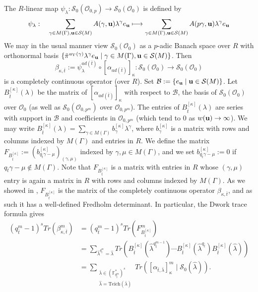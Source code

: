 \documentclass{article}
\theoremstyle{remark}
\def\bb #1{ {\mathbb #1} }
\def\c #1{ {\mathcal #1} }
\def\b #1{ {\bf #1} }
\begin{document}
The $R$-linear map $\psi_\lambda: \c S_0(\c O_{0, p}) \rightarrow \c S_0(\c O_0)$ is defined by 
\[
\psi_\lambda: \quad \sum_{\gamma \in M(\Gamma), \b u \in \c S(M)} A(\gamma, \b u)  \lambda^\gamma e_{\b u} \longmapsto \sum_{\gamma \in M(\Gamma), \b u \in \c S(M)} A(p \gamma, \b u)  \lambda^\gamma e_{\b u}
\]
We may in the usual manner view $\c S_0(\c O_0)$ as a $p$-adic Banach space over $R$ with orthonormal basis $\{ \tilde \pi^{w_\Gamma(\gamma)} \lambda^\gamma e_{\b u} \mid \gamma \in M(\Gamma), \b u \in \c S(M) \}$. Then 
\[
\beta_{\kappa, \bar t} := \psi_\lambda^{a d(\bar t)} \circ [\alpha_{a d(\bar t)}]_\kappa: \c S_0(\c O_0) \rightarrow \c S_0(\c O_0)
\]
is a completely continuous operator (over $R$).  Set $\c B := \{ e_{\b u} \mid  \b u \in \c S(M)\}$. Let $B^{[\kappa]}_{\bar t}(\lambda)$ be the matrix of $[\alpha_{a d(\bar t)}]_\kappa$ with respect to $\c B$, the basis of $\c S_0(\c O_0)$ over $\c O_0$ (as well as $\c S_0(\c O_{0, p^m})$ over $\c O_{0, p^m}$). The entries of $B_{\bar t}^{[\kappa]}(\lambda)$ are series with support in $\c B$ and coefficients in $\c O_{0, p^m}$ (which tend to 0 as $w(\b u) \rightarrow \infty$). We may write $B^{[\kappa]}_{\bar t}(\lambda) = \sum_{\gamma \in M(\Gamma)} b_\gamma^{[\kappa]} \lambda^\gamma$, where $b_\gamma^{[\kappa]}$ is a matrix with rows and columns indexed by $M(\Gamma)$ and entries in $R$. We define the matrix $F_{B^{[\kappa]}_{\bar t}} := (b_{q_{\bar t} \gamma - \mu}^{[\kappa]} )_{(\gamma, \mu)}$ indexed by $\gamma, \mu \in M(\Gamma)$, and we set $b_{q_{\bar t} \gamma - \mu}^{[\kappa]} := 0$ if $q_{\bar t} \gamma - \mu \not\in M(\Gamma)$. Note that $F_{B^{[\kappa]}_{\bar t}}$ is a matrix with entries in $R$ whose $(\gamma, \mu)$ entry is again a matrix in $R$ with rows and columns indexed by $M(\Gamma)$. As we showed in \cite[\S 2.3]{MR3239170}, $F_{B^{[\kappa]}_{\bar t}}$ is the matrix of the completely continuous operator $\beta_{\kappa, \bar t}$, and as such it has a well-defined Fredholm determinant. In particular, the Dwork trace formula gives
\begin{align*}
(q_{\bar t}^m - 1)^s Tr( \beta_{\kappa, \bar t}^m ) &= (q_{\bar t}^m - 1)^s Tr( F_{B^{[\kappa]}_{\bar t}}^m) \\
&= \sum_{\hat \lambda^{q_{\bar t}^m} = \hat \lambda} Tr \left( B^{[\kappa]}_{\bar t}(\hat \lambda^{q_{\bar t}^{m-1}}) \cdots B^{[\kappa]}_{\bar t}(\hat \lambda^{q_{\bar t}}) B^{[\kappa]}_{\bar t}(\hat \lambda) \right) \\
&= \sum_{\substack{ \bar \lambda \in (\bb F_{q_{\bar t}^m}^*)^s \\ \hat \lambda = \text{Teich}(\bar \lambda)}}  Tr \left( [ \alpha_{\bar t, \bar \lambda} ]_{\kappa}^m \mid \c S_0(\hat \lambda) \right).
\end{align*}
\end{document}
